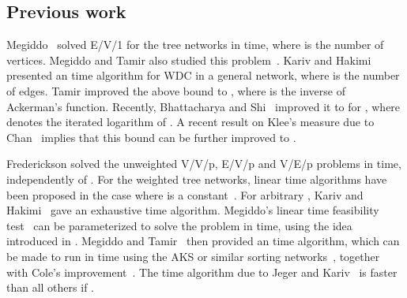 \documentclass{llncs}
\begin{document}
\subsection{Previous work}
Megiddo~\cite{megiddo1983a} solved E/V/1 for the tree networks
in  time,
where  is the number of vertices.
Megiddo and Tamir also studied this problem~\cite{megiddo1983c}.
Kariv and Hakimi \cite{kariv1979b} presented
an  time algorithm for WDC in a general network,
where  is the number of edges.
Tamir \cite{tamir1988} improved the above bound to ,
where  is the inverse of Ackerman's function.
Recently, Bhattacharya and Shi~\cite{bhattacharya2014b} improved it to
 for ,
where  denotes the iterated logarithm of .
A recent result on Klee's measure due to Chan~\cite{chan2013} implies that
this bound can be further improved to .



Frederickson \cite{frederickson1990,frederickson1991b} solved the unweighted
V/V/p, E/V/p and V/E/p problems in  time, independently of .
For the weighted tree networks, linear time algorithms have been proposed
in the case where  is a constant~\cite{benmoshe2006,shi2008}.
For arbitrary , Kariv and Hakimi~\cite{kariv1979b} gave an exhaustive  time
algorithm.
Megiddo's linear time feasibility test~\cite{megiddo1981} can be parameterized
to solve the problem in  time,
using the idea introduced in \cite{megiddo1981}.
Megiddo and Tamir~\cite{megiddo1983c} then provided
an  time algorithm,
which can be made to run in  time using the AKS or similar
 sorting networks~\cite{ajtai1983,goodrich2014,seiferas2009},
together with Cole's improvement~\cite{cole1987}.
The  time algorithm due to Jeger and Kariv~\cite{jeger1985}
is faster than all others if .
\end{document}
